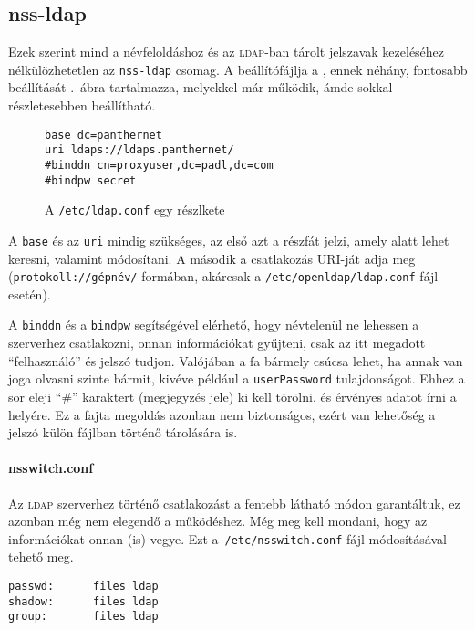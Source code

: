 \subsection{nss-ldap}
Ezek szerint mind a névfeloldáshoz és az \textsc{ldap}-ban tárolt jelszavak kezeléséhez nélkülözhetetlen az
\texttt{nss-ldap} csomag. A beállítófájlja a , ennek néhány, fontosabb beállítását
.\ ábra tartalmazza, melyekkel már működik, ámde sokkal részletesebben beállítható.

\begin{figure}[tbh]
\begin{Verbatim}[frame=single,label=/etc/ldap.conf részlet]
base dc=panthernet
uri ldaps://ldaps.panthernet/
#binddn cn=proxyuser,dc=padl,dc=com
#bindpw secret
\end{Verbatim}
  
  \caption{A \texttt{/etc/ldap.conf} egy részlkete}
  \label{fig:ldap-ldap.conf}
\end{figure}

A \texttt{base} és az \texttt{uri} mindig szükséges, az első azt a részfát jelzi, amely alatt lehet keresni, valamint
módosítani. A második a csatlakozás \textsc{URI}-ját adja meg (\texttt{protokoll://gépnév/} formában, akárcsak a
\texttt{/etc/openldap/ldap.conf} fájl esetén).

A \texttt{binddn} és a \texttt{bindpw} segítségével elérhető, hogy névtelenül ne lehessen a szerverhez csatlakozni,
onnan információkat gyűjteni, csak az itt megadott ``felhasználó'' és jelszó tudjon. Valójában a fa bármely csúcsa
lehet, ha annak van joga olvasni szinte bármit, kivéve például a \texttt{userPassword} tulajdonságot. Ehhez a sor
eleji ``\#'' karaktert (megjegyzés jele) ki kell törölni, és érvényes adatot írni a helyére. Ez a fajta megoldás azonban
nem biztonságos, ezért van lehetőség a jelszó külön fájlban történő tárolására is.


\paragraph{nsswitch.conf} Az \textsc{ldap} szerverhez történő csatlakozást a fentebb látható módon garantáltuk, ez
azonban még nem elegendő a működéshez. Még meg kell mondani, hogy az információkat onnan (is) vegye. Ezt
a~\texttt{/etc/nsswitch.conf} fájl módosításával tehető meg.

\begin{Verbatim}[frame=single,label=/etc/nsswitch.conf \textsc{ldap}-ot használó része]
passwd:      files ldap
shadow:      files ldap
group:       files ldap
\end{Verbatim}

